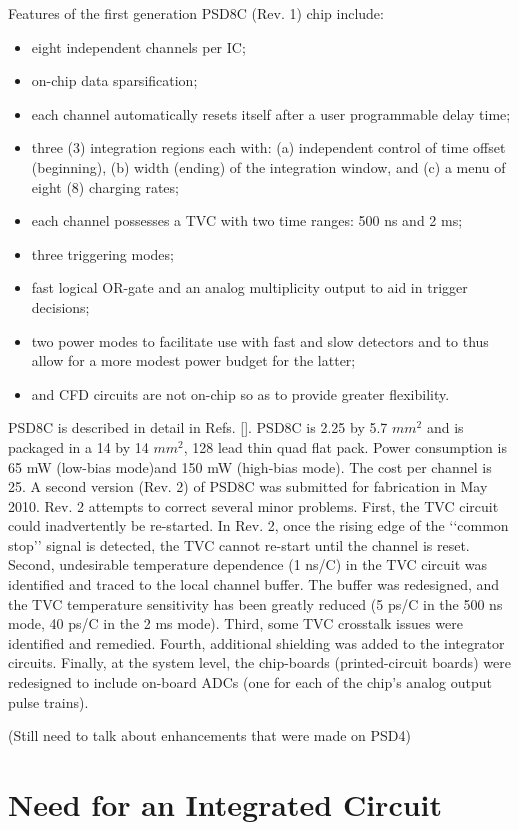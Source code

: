 \documentclass[12pt,oneside,final]{siuethesis}
\theoremstyle{definition}
\begin{document}
Features of the first generation PSD8C (Rev. 1) chip include:
\begin{itemize}
\item
eight independent channels per IC;
\item
on-chip data sparsification;
\item
each channel automatically resets itself after a user programmable delay time;
\item
three (3) integration regions each with: (a) independent
control of time offset (beginning), (b) width (ending) of the
integration window, and (c) a menu of eight (8) charging rates;
\item
each channel possesses a TVC with two time ranges: 500 ns and 2 ms;
\item
three triggering modes;
\item
fast logical OR-gate and an analog multiplicity output to aid in
trigger decisions;
\item
two power modes to facilitate use with fast and slow detectors
and to thus allow for a more modest power budget for the
latter; 
\item
and CFD circuits are not on-chip so as to provide greater flexibility.
\end{itemize}

PSD8C is described in detail in Refs. []. PSD8C is 2.25 by 5.7 $mm^2$ and is packaged in a 14 by 14 $mm^2$, 128 lead thin quad flat pack. Power consumption is 65 mW (low-bias mode)and 150 mW (high-bias mode). The cost per channel is 25.
A second version (Rev. 2) of PSD8C was submitted for fabrication in May 2010. Rev. 2 attempts to correct several minor
problems. First, the TVC circuit could inadvertently be re-started. In Rev. 2, once the rising edge of the ‘‘common stop’’ signal is detected, the TVC cannot re-start until the channel is reset. Second, undesirable temperature dependence (1 ns/C) in the TVC circuit was identified and traced to the local channel buffer. The buffer was redesigned, and the TVC temperature sensitivity has been greatly reduced (5 ps/C in the 500 ns mode, 40 ps/C in the 2 ms mode). Third, some TVC crosstalk issues were identified and remedied. Fourth, additional shielding was added to the integrator circuits. Finally, at the system level, the chip-boards (printed-circuit boards) were redesigned to include on-board ADCs (one for each of the chip’s analog output pulse trains).

(Still need to talk about enhancements that were made on PSD4)


\section{Need for an Integrated Circuit}
\end{document}
